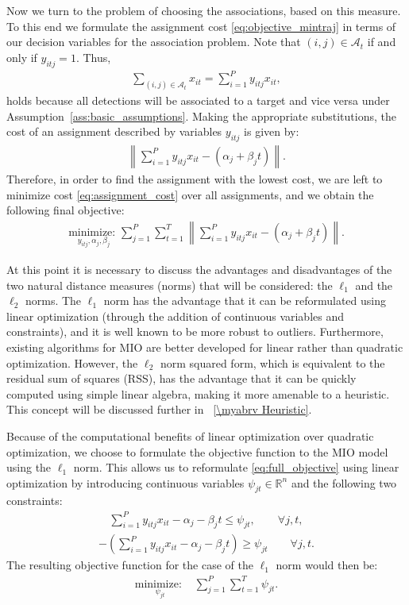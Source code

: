 Now we turn to the problem of choosing the associations, based on this measure. To this end we formulate the assignment cost \eqref{eq:objective_mintraj} in terms of our decision variables for the association problem. Note that $(i,j)\in\mathcal{A}_t$ if and only if $y_{itj}=1$. Thus,
\begin{align}
\sum_{(i,j)\in \mathcal{A}_{t}} x_{it} = \sum_{i=1}^{P}y_{itj}x_{it},
\end{align}
holds because all detections will be associated to a target and vice versa under Assumption~\ref{ass:basic_assumptions}.
Making the appropriate substitutions, the cost of an assignment described by variables $y_{itj}$ is given by:\begin{align}\label{eq:assignment_cost}
\left \| \sum_{i=1}^{P}y_{itj}x_{it} - (\alpha_{j} + \beta_{j}t)\right \|.
\end{align}
Therefore, in order to find the assignment with the lowest cost, we are left to minimize cost \eqref{eq:assignment_cost} over all assignments, and we obtain the following final objective: 
\begin{align}\label{eq:full_objective}
 \underset{y_{itj}, \alpha_{j}, \beta_{j}}{\text{minimize: }}\sum_{j=1}^{P} \sum_{t=1}^{T}  \left \| \sum_{i=1}^{P}y_{itj}x_{it} - (\alpha_{j} + \beta_{j}t) \right \|.
\end{align}

At this point it is necessary to discuss the advantages and disadvantages of the two natural distance measures (norms) that will be considered: the $\ell_1$ and the $\ell_2$ norms. The $\ell_1$ norm has the advantage that it can be reformulated using linear optimization (through the addition of continuous variables and constraints), and it is well known to be more robust to outliers. Furthermore, existing algorithms for MIO are better developed for linear rather than quadratic optimization. However, the $\ell_2$ norm squared form, which is equivalent to the residual sum of squares (RSS), has the advantage that it can be quickly computed using simple linear algebra, making it more amenable to a heuristic. This concept will be discussed further in \mysection~\ref{\myabrv Heuristic}.

Because of the computational benefits of linear optimization over quadratic optimization, we choose to formulate the objective function to the MIO model using the $\ell_1$ norm. This allows us to reformulate \eqref{eq:full_objective} using linear optimization by introducing continuous variables $\psi_{jt} \in \mathbb{R}^n$ and the following two constraints:
\begin{align}
\sum_{i=1}^{P}y_{itj}x_{it} - \alpha_{j} - \beta_{j}t \leq \psi_{jt}, \qquad \forall j,t,
\end{align}
\begin{align}
-\left(\sum_{i=1}^{P}y_{itj}x_{it} - \alpha_{j} - \beta_{j}t\right) \geq \psi_{jt} \qquad \forall j,t.
\end{align}
The resulting objective function for the case of the $\ell_1$ norm would then be:
\begin{align}
\underset{\psi_{jt}}{\text{minimize: }} & \sum_{j=1}^{P} \sum_{t=1}^{T} \psi_{jt}.
\end{align}

